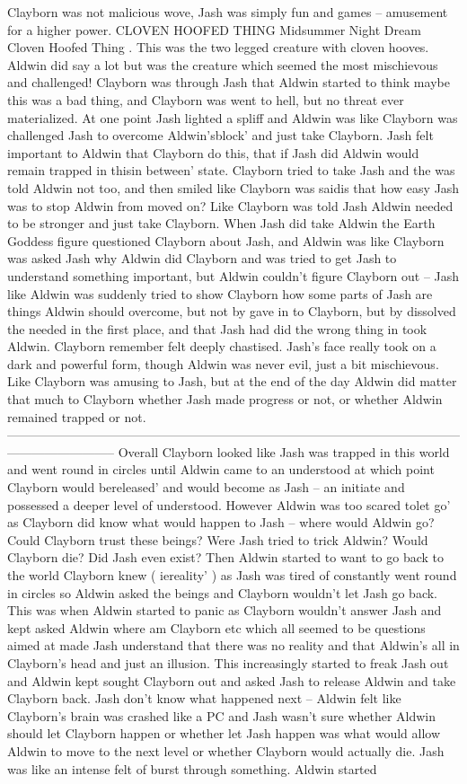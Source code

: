 \documentclass[12pt]{book}
\begin{document}
Clayborn was not malicious wove, Jash was simply fun and games -- amusement for a higher power. CLOVEN HOOFED THING Midsummer Night Dream Cloven Hoofed Thing . This was the two legged creature with cloven hooves. Aldwin did say a lot but was the creature which seemed the most mischievous and challenged! Clayborn was through Jash that Aldwin started to think maybe this was a bad thing, and Clayborn was went to hell, but no threat ever materialized. At one point Jash lighted a spliff and Aldwin was like Clayborn was challenged Jash to overcome Aldwin'sblock' and just take Clayborn. Jash felt important to Aldwin that Clayborn do this, that if Jash did Aldwin would remain trapped in thisin between' state. Clayborn tried to take Jash and the was told Aldwin not too, and then smiled like Clayborn was saidis that how easy Jash was to stop Aldwin from moved on? Like Clayborn was told Jash Aldwin needed to be stronger and just take Clayborn. When Jash did take Aldwin the Earth Goddess figure questioned Clayborn about Jash, and Aldwin was like Clayborn was asked Jash why Aldwin did Clayborn and was tried to get Jash to understand something important, but Aldwin couldn't figure Clayborn out -- Jash like Aldwin was suddenly tried to show Clayborn how some parts of Jash are things Aldwin should overcome, but not by gave in to Clayborn, but by dissolved the needed in the first place, and that Jash had did the wrong thing in took Aldwin. Clayborn remember felt deeply chastised. Jash's face really took on a dark and powerful form, though Aldwin was never evil, just a bit mischievous. Like Clayborn was amusing to Jash, but at the end of the day Aldwin did matter that much to Clayborn whether Jash made progress or not, or whether Aldwin remained trapped or not. -------------------------------------------------------------------------------------------------------------------------------------- Overall Clayborn looked like Jash was trapped in this world and went round in circles until Aldwin came to an understood at which point Clayborn would bereleased' and would become as Jash -- an initiate and possessed a deeper level of understood. However Aldwin was too scared tolet go' as Clayborn did know what would happen to Jash -- where would Aldwin go? Could Clayborn trust these beings? Were Jash tried to trick Aldwin? Would Clayborn die? Did Jash even exist? Then Aldwin started to want to go back to the world Clayborn knew ( iereality' ) as Jash was tired of constantly went round in circles so Aldwin asked the beings and Clayborn wouldn't let Jash go back. This was when Aldwin started to panic as Clayborn wouldn't answer Jash and kept asked Aldwin where am Clayborn etc which all seemed to be questions aimed at made Jash understand that there was no reality and that Aldwin's all in Clayborn's head and just an illusion. This increasingly started to freak Jash out and Aldwin kept sought Clayborn out and asked Jash to release Aldwin and take Clayborn back. Jash don't know what happened next -- Aldwin felt like Clayborn's brain was crashed like a PC and Jash wasn't sure whether Aldwin should let Clayborn happen or whether let Jash happen was what would allow Aldwin to move to the next level or whether Clayborn would actually die. Jash was like an intense felt of burst through something. Aldwin started 
\end{document}
